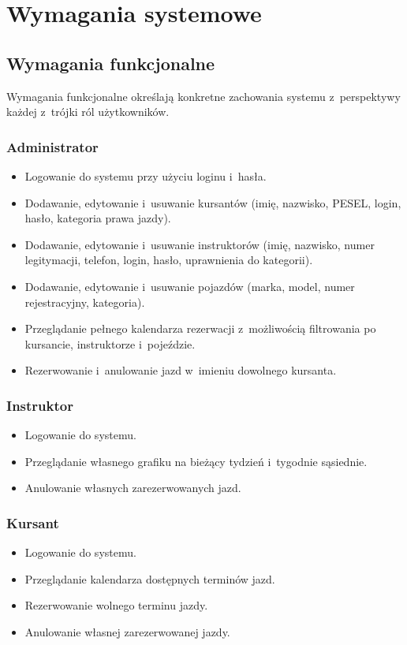 \chapter{Wymagania systemowe}
\label{ch:wymagania}

\section{Wymagania funkcjonalne}

Wymagania funkcjonalne okre\'{s}laj\k{a} konkretne zachowania systemu z~perspektywy
ka\.{z}dej z~tr\'{o}jki r\'{o}l u\.{z}ytkownik\'{o}w.

\subsection{Administrator}
\begin{itemize}
  \item Logowanie do systemu przy u\.{z}yciu loginu i~has\l{}a.
  \item Dodawanie, edytowanie i~usuwanie kursant\'{o}w (imi\k{e}, nazwisko, PESEL, login,
        has\l{}o, kategoria prawa jazdy).
  \item Dodawanie, edytowanie i~usuwanie instruktor\'{o}w (imi\k{e}, nazwisko, numer
        legitymacji, telefon, login, has\l{}o, uprawnienia do kategorii).
  \item Dodawanie, edytowanie i~usuwanie pojazd\'{o}w (marka, model, numer rejestracyjny,
        kategoria).
  \item Przegl\k{a}danie pe\l{}nego kalendarza rezerwacji z~mo\.{z}liwo\'{s}ci\k{a}
        filtrowania po kursancie, instruktorze i~poje\'{z}dzie.
  \item Rezerwowanie i~anulowanie jazd w~imieniu dowolnego kursanta.
\end{itemize}

\subsection{Instruktor}
\begin{itemize}
  \item Logowanie do systemu.
  \item Przegl\k{a}danie w\l{}asnego grafiku na bie\.{z}\k{a}cy tydzie\'{n} i~tygodnie
        s\k{a}siednie.
  \item Anulowanie w\l{}asnych zarezerwowanych jazd.
\end{itemize}

\subsection{Kursant}
\begin{itemize}
  \item Logowanie do systemu.
  \item Przegl\k{a}danie kalendarza dost\k{e}pnych termin\'{o}w jazd.
  \item Rezerwowanie wolnego terminu jazdy.
  \item Anulowanie w\l{}asnej zarezerwowanej jazdy.
\end{itemize}

